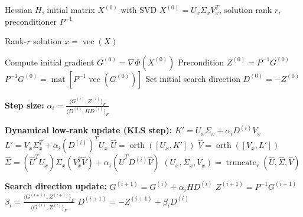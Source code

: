 \begin{algorithm}
\caption{DLRA-PCG scheme}
\label{alg:DLRA-PCG}
\begin{algorithmic}[1]

\Require Hessian $H$, initial matrix $X^{(0)}$ with SVD $X^{(0)} = U_x \Sigma_x V_x^T$, solution rank $r$, preconditioner $P^{-1}$

\Ensure Rank-$r$ solution $x = \operatorname{vec}(X)$

\State Compute initial gradient $G^{(0)} = \nabla \Phi(X^{(0)})$
\State Precondition $Z^{(0)} = P^{-1} G^{(0)}$
\Comment $P^{-1} G^{(0)} =
\operatorname{mat}[P^{-1} \operatorname{vec}(G^{(0)})]$
\State Set initial search direction $D^{(0)} = -Z^{(0)}$


    \State \textbf{Step size:}
    \State $\displaystyle \alpha_i =
    \frac{\langle G^{(i)}, Z^{(i)} \rangle_F}
         {\langle D^{(i)}, H D^{(i)} \rangle_F}$

    \State \textbf{Dynamical low-rank update (KLS step):}
    \State $K' = U_x \Sigma_x + \alpha_i D^{(i)} V_x$
    \State $L' = V_x \Sigma_x^T + \alpha_i (D^{(i)})^T U_x$
    \State $\hat U = \operatorname{orth}([U_x, K'])$
    \State $\hat V = \operatorname{orth}([V_x, L'])$
    \State $\hat \Sigma = (\hat U^T U_x)\Sigma_x(V_x^T \hat V) + \alpha_i (\hat U^T D^{(i)} \hat V)$
    \State $(U_x, \Sigma_x, V_x) = \operatorname{truncate}_r(\hat U, \hat \Sigma, \hat V)$

    \State \textbf{Search direction update:}
    \State $G^{(i+1)} = G^{(i)} + \alpha_i H D^{(i)}$
    \State $Z^{(i+1)} = P^{-1} G^{(i+1)}$
    \State $\displaystyle \beta_i =
    \frac{\langle G^{(i+1)}, Z^{(i+1)} \rangle_F}
         {\langle G^{(i)}, Z^{(i)} \rangle_F}$
    \State $D^{(i+1)} = -Z^{(i+1)} + \beta_i D^{(i)}$

\EndFor

\end{algorithmic}
\end{algorithm}
